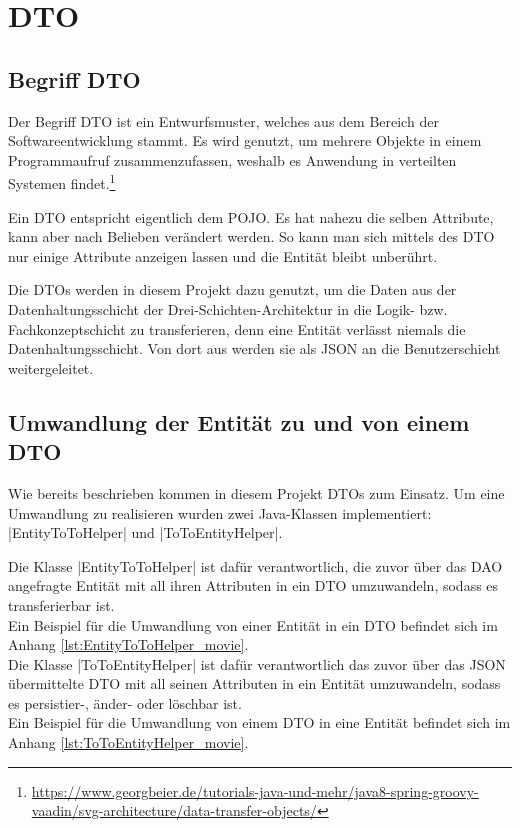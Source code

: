 \section{\acf{DTO}}
\label{sec:dto}

\subsection{Begriff \acf{DTO}}
\label{ssec:Was_ist_dto}

Der Begriff \ac{DTO} ist ein Entwurfsmuster, welches aus dem Bereich der Softwareentwicklung stammt.
Es wird genutzt, um mehrere Objekte in einem Programmaufruf zusammenzufassen, weshalb es Anwendung in verteilten Systemen findet.\footnote{\url{https://www.georgbeier.de/tutorials-java-und-mehr/java8-spring-groovy-vaadin/svg-architecture/data-transfer-objects/}}

Ein \ac{DTO} entspricht eigentlich dem \ac{POJO}.
Es hat nahezu die selben Attribute, kann aber nach Belieben verändert werden.
So kann man sich mittels des \ac{DTO} nur einige Attribute anzeigen lassen und die Entität bleibt unberührt.

Die \acsp{DTO} werden in diesem Projekt dazu genutzt, um die Daten aus der Datenhaltungsschicht der Drei-Schichten-Architektur in die Logik- bzw. Fachkonzeptschicht zu transferieren, denn eine Entität verlässt niemals die Datenhaltungsschicht.
Von dort aus werden sie als \acs{JSON} an die Benutzerschicht weitergeleitet.

\subsection{Umwandlung der Entität zu und von einem \acf{DTO}}
\label{ssec:umwandlung_dto}

Wie bereits beschrieben kommen in diesem Projekt \acp{DTO} zum Einsatz.
Um eine Umwandlung zu realisieren wurden zwei Java-Klassen implementiert: \jinline|EntityToToHelper| und \jinline|ToToEntityHelper|. 

Die Klasse \jinline|EntityToToHelper| ist dafür verantwortlich, die zuvor über das \acs{DAO} angefragte Entität mit all ihren Attributen in ein \acs{DTO} umzuwandeln, sodass es transferierbar ist. \\
Ein Beispiel für die Umwandlung von einer Entität in ein \acs{DTO} befindet sich im Anhang \vref{lst:EntityToToHelper_movie}. \\

Die Klasse \jinline|ToToEntityHelper| ist dafür verantwortlich das zuvor über das \acs{JSON} übermittelte \acs{DTO} mit all seinen Attributen in ein Entität umzuwandeln, sodass es persistier-, änder- oder löschbar ist.\\
Ein Beispiel für die Umwandlung von einem \acs{DTO} in eine Entität befindet sich im Anhang \vref{lst:ToToEntityHelper_movie}.
